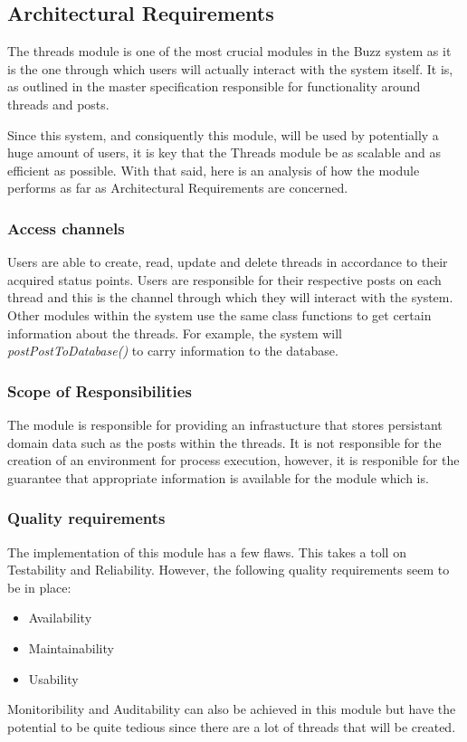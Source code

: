 \subsection{Architectural Requirements}
\begin{flushleft}

The threads module is one of the most crucial modules in the Buzz system as it is the one through which users will actually interact with the system itself. It is, as outlined in the master specification responsible for functionality around threads and posts. 

Since this system, and consiquently this module, will be used by potentially a huge amount of users, it is key that the Threads module be as scalable and as efficient as possible. With that said, here is an analysis of how the module performs as far as Architectural Requirements are concerned.


\subsubsection{Access channels}
Users are able to create, read, update and delete threads in accordance to their acquired status points. Users are responsible for their respective posts on each thread and this is the channel through which they will interact with the system. Other modules within  the system use the same class functions to get certain information about the threads. For example, the system will \emph{postPostToDatabase()} to carry information to the database.

\subsubsection{Scope of Responsibilities}
The module is responsible for providing an infrastucture that stores persistant domain data such as the posts within the threads. It is not responsible for the creation of an environment for process execution, however, it is responible for the guarantee that appropriate information is available for the module which is.

\subsubsection{Quality requirements}
The implementation of this module has a few flaws. This takes a toll on Testability and Reliability. However, the following quality requirements seem to be in place:
\begin{itemize}
\item Availability
\item Maintainability
\item Usability
\end{itemize}
Monitoribility and Auditability can also be achieved in this module but have the potential to be quite tedious since there are a lot of threads that will be created.


\end{flushleft}
